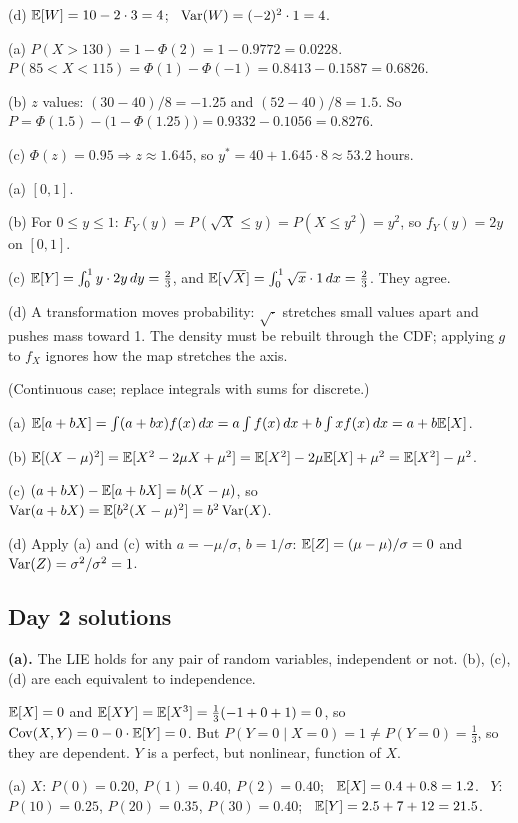 \documentclass[11pt]{article}
\begin{document}
(d) $\mathbb{E}[W]=10-2\cdot3=4$; \ $\operatorname{Var}(W)=(-2)^2\cdot1=4$.

(a) $P(X>130)=1-\Phi(2)=1-0.9772=0.0228$. \ $P(85<X<115)=\Phi(1)-\Phi(-1)=0.8413-0.1587=0.6826$.

(b) $z$ values: $(30-40)/8=-1.25$ and $(52-40)/8=1.5$. So $P=\Phi(1.5)-\big(1-\Phi(1.25)\big)=0.9332-0.1056=0.8276$.

(c) $\Phi(z)=0.95\Rightarrow z\approx1.645$, so $y^*=40+1.645\cdot8\approx53.2$ hours.

(a) $[0,1]$.

(b) For $0\le y\le1$: $F_Y(y)=P(\sqrt X\le y)=P(X\le y^2)=y^2$, so $f_Y(y)=2y$ on $[0,1]$.

(c) $\mathbb{E}[Y]=\int_0^1 y\cdot2y\,dy=\tfrac23$, and $\mathbb{E}[\sqrt X]=\int_0^1\sqrt x\cdot1\,dx=\tfrac23$. They agree.

(d) A transformation moves probability: $\sqrt{\cdot}$ stretches small values apart and pushes mass toward 1. The density must be rebuilt through the CDF; applying $g$ to $f_X$ ignores how the map stretches the axis.

 (Continuous case; replace integrals with sums for discrete.)

(a) $\mathbb{E}[a+bX]=\int(a+bx)f(x)\,dx=a\int f(x)\,dx+b\int xf(x)\,dx=a+b\mathbb{E}[X]$.

(b) $\mathbb{E}[(X-\mu)^2]=\mathbb{E}[X^2-2\mu X+\mu^2]=\mathbb{E}[X^2]-2\mu\mathbb{E}[X]+\mu^2=\mathbb{E}[X^2]-\mu^2$.

(c) $(a+bX)-\mathbb{E}[a+bX]=b(X-\mu)$, so $\operatorname{Var}(a+bX)=\mathbb{E}[b^2(X-\mu)^2]=b^2\operatorname{Var}(X)$.

(d) Apply (a) and (c) with $a=-\mu/\sigma$, $b=1/\sigma$: $\mathbb{E}[Z]=(\mu-\mu)/\sigma=0$ and $\operatorname{Var}(Z)=\sigma^2/\sigma^2=1$.

\subsection{Day 2 solutions}

 \textbf{(a).} The LIE holds for any pair of random variables, independent or not. (b), (c), (d) are each equivalent to independence.

 $\mathbb{E}[X]=0$ and $\mathbb{E}[XY]=\mathbb{E}[X^3]=\tfrac13(-1+0+1)=0$, so $\operatorname{Cov}(X,Y)=0-0\cdot\mathbb{E}[Y]=0$. But $P(Y=0\mid X=0)=1\neq P(Y=0)=\tfrac13$, so they are dependent. $Y$ is a perfect, but nonlinear, function of $X$.

(a) $X$: $P(0)=0.20$, $P(1)=0.40$, $P(2)=0.40$; \ $\mathbb{E}[X]=0.4+0.8=1.2$. \ $Y$: $P(10)=0.25$, $P(20)=0.35$, $P(30)=0.40$; \ $\mathbb{E}[Y]=2.5+7+12=21.5$.
\end{document}
